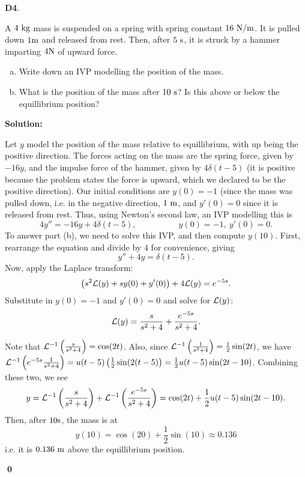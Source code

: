 \documentclass{article}
\newenvironment{problem}[1]
{
  \begin{flushleft}
  \textbf{#1}.
  \ignorespaces
}
{
  \end{flushleft}
}
\newenvironment{solution}
{
  \ignorespaces
  \textbf{Solution:}
}
{
  \ignorespacesafterend
  \begin{flushright}
  {\bfseries \qed}
  \end{flushright}
}
\begin{document}
\begin{problem}{D4}
A \(4\ {\rm kg}\) mass is suspended on a spring with spring constant \(16\ {\rm N/m}\).  It is pulled down \(1 {\rm m}\) and released from rest.  Then, after \(5\ {\rm s}\), it is struck by a hammer imparting \(4 {\rm N}\) of upward force.
\begin{enumerate}[(a)]
\item Write down an IVP modelling the position of the mass.
\item What is the position of the mass after \(10 \ {\rm s}\)?  Is this above or below the equillibrium position?
\end{enumerate}
\end{problem}
\begin{solution}
Let \(y\) model the position of the mass relative to equillibrium, with up being the positive direction.  The forces acting on the mass are the spring force, given by \(-16 y\), and the impulse force of the hammer, given by \(4 \delta(t-5)\) (it is positive because the problem states the force is upward, which we declared to be the positive direction).  Our initial conditions are \(y(0)= -1\) (since the mass was pulled down, i.e. in the negative direction, \(1\ {\rm m}\), and \(y'(0)=0\) since it is released from rest.  Thus, using Newton's second law, an IVP modelling this is
\[ 4y''=-16y+4\delta(t-5), \hspace{5em} y(0)=-1,\ y'(0)=0.\]
To answer part (b), we need to solve this IVP, and then compute \(y(10)\).  First, rearrange the equation and divide by \(4\) for convenience, giving 
\[ y'' + 4y =  \delta(t-5).\]
Now, apply the Laplace transform:
\[\left(s^2\mathcal{L}(y)+sy(0)+y'(0)\right)+4\mathcal{L}(y) = e^{-5s}.\]
Substitute in \(y(0)=-1\) and \(y'(0)=0\) and solve for \(\mathcal{L}(y)\):
\[\mathcal{L}(y) = \frac{s}{s^2+4} + \frac{e^{-5s}}{s^2+4}.\]

Note that \(\mathcal{L}^{-1}\left(\frac{s}{s^2+4}\right) =  \cos(2t)\).  Also, since \(\mathcal{L}^{-1} \left(\frac{1}{s^2+4}\right) = \frac{1}{2} \sin(2t)\), we have \(\mathcal{L}^{-1}\left(e^{-5s} \frac{1}{s^2+4}\right) = u(t-5) \left(\frac{1}{2} \sin(2(t-5)\right) = \frac{1}{2} u(t-5) \sin(2t-10)\).  Combining these two, we see
\[y = \mathcal{L}^{-1} \left(\frac{s}{s^2+4}\right)+\mathcal{L}^{-1}\left(\frac{e^{-5s}}{s^2+4}\right) = \cos(2t)+\frac{1}{2} u(t-5)\sin(2t-10).\]
Then, after \(10{\rm s}\), the mass is at
\[y(10)= \cos(20) + \frac{1}{2} \sin(10) \approx 0.136 \]
i.e. it is \(0.136\ {\rm m}\) above the equillibrium position.
\end{solution}
\end{document}
